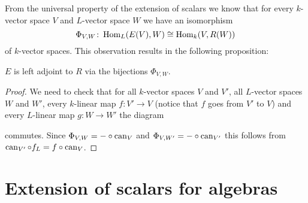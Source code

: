From the universal property of the extension of scalars we know that for every $k$-vector space $V$ and $L$-vector space $W$ we have an isomorphism
\[
 \Phi_{V,W} \colon \operatorname{Hom}_L(E(V),W) \cong \operatorname{Hom}_k(V,R(W))
\]
of $k$-vector spaces. This observation results in the following proposition:
 
\begin{prop}
 $E$ is left adjoint to $R$ via the bijections $\Phi_{V,W}$.
\end{prop}
\begin{proof}
 We need to check that for all $k$-vector spaces $V$ and $V'$, all $L$-vector spaces $W$ and $W'$, every $k$-linear map $f \colon V' \to V$ (notice that $f$ goes from $V'$ to $V$) and every $L$-linear map $g \colon W \to W'$ the diagram
 \begin{center}
 \end{center}
 commutes. Since $\Phi_{V,W} = - \circ \operatorname{can}_V$ and $\Phi_{V,W'} = - \circ \operatorname{can}_{V'}$ this follows from $\operatorname{can}_{V'} \circ f_L = f \circ \operatorname{can}_V$.
\end{proof}





\section{Extension of scalars for algebras}


